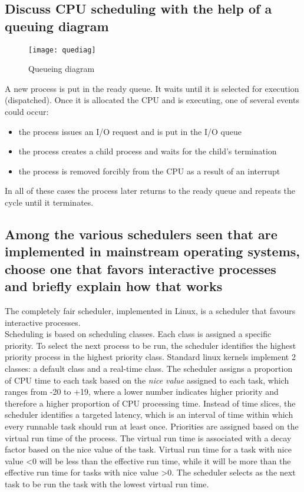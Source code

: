 \documentclass{article}
\begin{document}
\subsection{Discuss CPU scheduling with the help of a queuing diagram}
\begin{figure}[H]
    \centering
    \texttt{[image: quediag]}
    \caption{Queueing diagram}
\end{figure}

A new process is put in the ready queue. It waits until it is selected for execution (dispatched). Once it is allocated the CPU and is executing, one of several events could occur:\begin{itemize}
    \item the process issues an I/O request and is put in the I/O queue
    \item the process creates a child process and waits for the child's termination
    \item the process is removed forcibly from the CPU as a result of an interrupt
\end{itemize}
In all of these cases the process later returns to the ready queue and repeats the cycle until it terminates. 
\subsection{Among the various schedulers seen that are implemented in mainstream operating systems, choose one that favors interactive processes and briefly explain how that works}
The completely fair scheduler, implemented in Linux, is a scheduler that favours interactive processes.\\
Scheduling is based on scheduling classes. Each class is assigned a specific priority. To select the next process to be run, the scheduler identifies the highest priority process in the highest priority class. Standard linux kernels implement 2 classes: a default class and a real-time class. The scheduler assigns a proportion of CPU time to each task based on the \emph{nice value} assigned to each task, which ranges from -20 to +19, where a lower number indicates higher priority and therefore a higher proportion of CPU processing time. Instead of time slices, the scheduler identifies a targeted latency, which is an interval of time within which every runnable task should run at least once. Priorities are assigned based on the virtual run time of the process. The virtual run time is associated with a decay factor based on the nice value of the task. Virtual run time for a task with nice value <0 will be less than the effective run time, while it will be more than the effective run time for tasks with nice value >0. The scheduler selects as the next task to be run the task with the lowest virtual run time.
\end{document}
